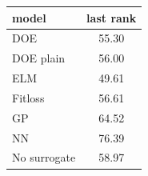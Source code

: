 \begin{tabular}{|lc|}
\hline
model & last rank\\
\hline
DOE & 55.30 \\
DOE plain & 56.00 \\
ELM & 49.61 \\
Fitloss & 56.61 \\
GP & 64.52 \\
NN & 76.39 \\
No surrogate & 58.97 \\
\hline
\end{tabular}
